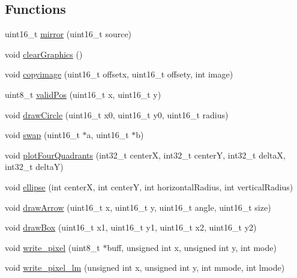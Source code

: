 \subsection*{\-Functions}
\begin{DoxyCompactItemize}
\item 
uint16\-\_\-t \hyperlink{group___o_s_d_g_e_n_module_ga5a45071c8d6dc7fb048d5f791831b868}{mirror} (uint16\-\_\-t source)
\item 
void \hyperlink{group___o_s_d_g_e_n_module_gaef4730e1cc093c1b98a70d8e9241c3de}{clear\-Graphics} ()
\item 
void \hyperlink{group___o_s_d_g_e_n_module_gaddad1c4131ec096796b78d23a4082da6}{copyimage} (uint16\-\_\-t offsetx, uint16\-\_\-t offsety, int image)
\item 
uint8\-\_\-t \hyperlink{group___o_s_d_g_e_n_module_ga2f47e18d66eab4b942c583d519b122d8}{valid\-Pos} (uint16\-\_\-t x, uint16\-\_\-t y)
\item 
void \hyperlink{group___o_s_d_g_e_n_module_ga62264c6d524275901f3a3f4d43a13353}{draw\-Circle} (uint16\-\_\-t x0, uint16\-\_\-t y0, uint16\-\_\-t radius)
\item 
void \hyperlink{group___o_s_d_g_e_n_module_ga6079548d874cda431d71e15174ff375c}{swap} (uint16\-\_\-t $\ast$a, uint16\-\_\-t $\ast$b)
\item 
void \hyperlink{group___o_s_d_g_e_n_module_ga3fc15f51865688e662571a829c21a3ec}{plot\-Four\-Quadrants} (int32\-\_\-t center\-X, int32\-\_\-t center\-Y, int32\-\_\-t delta\-X, int32\-\_\-t delta\-Y)
\item 
void \hyperlink{group___o_s_d_g_e_n_module_gad7ea00fa059e0f9ec514b43f176db91c}{ellipse} (int center\-X, int center\-Y, int horizontal\-Radius, int vertical\-Radius)
\item 
void \hyperlink{group___o_s_d_g_e_n_module_ga6b10ec15d9b155e3ecdd6bac85c227a9}{draw\-Arrow} (uint16\-\_\-t x, uint16\-\_\-t y, uint16\-\_\-t angle, uint16\-\_\-t size)
\item 
void \hyperlink{group___o_s_d_g_e_n_module_gae399f433b1adebe10b6108074e73ee59}{draw\-Box} (uint16\-\_\-t x1, uint16\-\_\-t y1, uint16\-\_\-t x2, uint16\-\_\-t y2)
\item 
void \hyperlink{group___o_s_d_g_e_n_module_gabbd31ecda0c72dedfc2f0455d7dedf3e}{write\-\_\-pixel} (uint8\-\_\-t $\ast$buff, unsigned int x, unsigned int y, int mode)
\item 
void \hyperlink{group___o_s_d_g_e_n_module_gac1761b4fcfac704692e9a6cb6b263c70}{write\-\_\-pixel\-\_\-lm} (unsigned int x, unsigned int y, int mmode, int lmode)

\end{DoxyCompactItemize}
